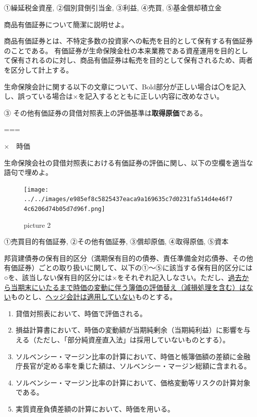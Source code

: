 \documentclass[report,gutter=10mm,fore-edge=10mm,uplatex,dvipdfmx]{jlreq}
\begin{document}

①繰延税金資産, ②個別貸倒引当金, ③利益, ④売買, ⑤基金償却積立金



商品有価証券について簡潔に説明せよ。


商品有価証券とは、不特定多数の投資家への転売を目的として保有する有価証券のことである。
有価証券が生命保険金杜の本来業務である資産運用を目的として保有されるのに対し、商品有価証券は転売を目的として保有されるため、両者を区分して計上する。


生命保険会計に関する以下の文章について、Bold部分が正しい場合は〇を記入し、誤っている場合は×を記入するとともに正しい内容に改めなさい。

③ その他有価証券の貸借対照表上の評価基準は\textbf{取得原価}である。

===


×　時価


生命保険会社の貸借対照表における有価証券の評価に関し、以下の空欄を適当な語句で埋めよ。

\begin{figure}
\centering
\texttt{[image: ../../images/e985ef8c5825437eaca9a169635c7d0231fa514d4e46f74c6206d74b05d7d96f.png]}
\caption{picture 2}
\end{figure}


①売買目的有価証券, ②その他有価証券, ③償却原価, ④取得原価, ⑤資本


邦貨建債券の保有目的区分（満期保有目的の債券、責任準備金対応債券、その他有価証券）ごとの取り扱いに関して、以下の①～⑤に該当する保有目的区分には○を、該当しない保有目的区分には×をそれぞれ記入しなさい。ただし、\underline{過去から当期末にいたるまで時価の変動に伴う簿価の評価替え（減損処理を含む）はない}ものとし、\underline{ヘッジ会計は適用していない}ものとする。

\begin{enumerate} [(1)]
\item 貸借対照表において、時価で評価される。 
\item 損益計算書において、時価の変動額が当期純剰余（当期純利益）に影響を与える（ただし、「部分純資産直入法」は採用していないものとする）。
\item ソルベンシー・マージン比率の計算において、時価と帳簿価額の差額に金融庁長官が定める率を乗じた額は、ソルベンシー・マージン総額に含まれる。
\item ソルベンシー・マージン比率の計算において、価格変動等リスクの計算対象である。
\item 実質資産負債差額の計算において、時価を用いる。
\end{enumerate}
\end{document}
